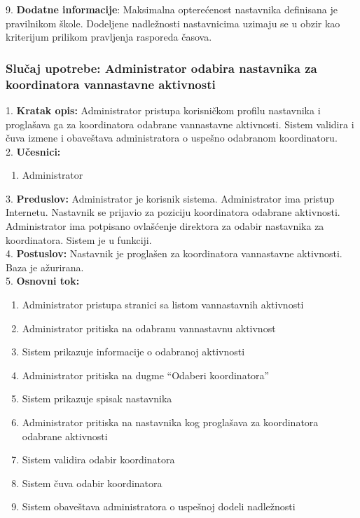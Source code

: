 \documentclass{article}
\begin{document}
9. \textbf{Dodatne informacije}: Maksimalna opterećenost nastavnika definisana je pravilnikom škole. Dodeljene nadležnosti nastavnicima uzimaju se u obzir kao kriterijum prilikom pravljenja rasporeda časova. \\

\subsubsection{Slučaj upotrebe: Administrator odabira nastavnika za koordinatora vannastavne aktivnosti}
1. \textbf{Kratak opis:} Administrator pristupa korisničkom profilu nastavnika i proglašava ga za koordinatora odabrane vannastavne aktivnosti. Sistem validira i čuva izmene i obaveštava administratora o uspešno odabranom koordinatoru. \\

2. \textbf{Učesnici:}
\begin{enumerate} [label=(\alph*)]
\item Administrator
\end{enumerate} 

3. \textbf{Preduslov:} Administrator je korisnik sistema. Administrator ima pristup Internetu. Nastavnik se prijavio za poziciju koordinatora odabrane aktivnosti. Administrator ima potpisano ovlašćenje direktora za odabir nastavnika za koordinatora. Sistem je u funkciji. \\

4. \textbf{Postuslov:} Nastavnik je proglašen za koordinatora vannastavne aktivnosti. Baza je ažurirana. \\

5. \textbf{Osnovni tok:} 
\begin{enumerate} [label=(\alph*)]
\item Administrator pristupa stranici sa listom vannastavnih aktivnosti
\item Administrator pritiska na odabranu vannastavnu aktivnost
\item Sistem prikazuje informacije o odabranoj aktivnosti
\item Administrator pritiska na dugme ``Odaberi koordinatora''
\item Sistem prikazuje spisak nastavnika
\item Administrator pritiska na nastavnika kog proglašava za koordinatora odabrane aktivnosti
\item Sistem validira odabir koordinatora
\item Sistem čuva odabir koordinatora
\item Sistem obaveštava administratora o uspešnoj dodeli nadležnosti
\end{enumerate}
\end{document}
